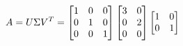 \documentclass[preview]{standalone}
\begin{document}
\begin{align*}
\special{dvisvgm:raw <g id='unique000'>}A = U \Sigma V^T = \begin{bmatrix}1 & 0 & 0\\0 & 1 & 0\\0 & 0 & 1\end{bmatrix}\begin{bmatrix}3 & 0\\0 & 2\\0 & 0\end{bmatrix}\begin{bmatrix}1 & 0\\0 & 1\end{bmatrix}\special{dvisvgm:raw </g>}
\end{align*}
\end{document}
